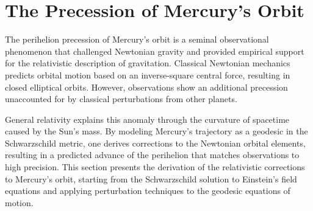 \documentclass{amsart}
\theoremstyle{remark}
\begin{document}
\section{The Precession of Mercury’s Orbit}
\label{sec:mercury}

The perihelion precession of Mercury’s orbit is a seminal observational phenomenon that challenged Newtonian gravity and provided empirical support for the relativistic description of gravitation. Classical Newtonian mechanics predicts orbital motion based on an inverse-square central force, resulting in closed elliptical orbits. However, observations show an additional precession unaccounted for by classical perturbations from other planets.

General relativity explains this anomaly through the curvature of spacetime caused by the Sun’s mass. By modeling Mercury’s trajectory as a geodesic in the Schwarzschild metric, one derives corrections to the Newtonian orbital elements, resulting in a predicted advance of the perihelion that matches observations to high precision. This section presents the derivation of the relativistic corrections to Mercury’s orbit, starting from the Schwarzschild solution to Einstein’s field equations and applying perturbation techniques to the geodesic equations of motion.
\end{document}
